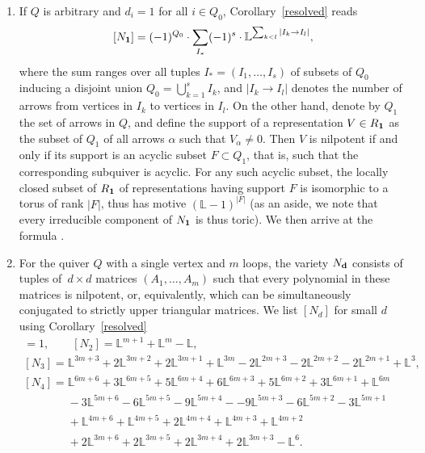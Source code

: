 \documentclass[pdftex]{sigma}
\numberwithin{equation}{section}
\theoremstyle{definition}
\begin{document}
\begin{enumerate}
\item[(3)] If $Q$ is arbitrary and $d_i=1$ for all $i\in Q_0$, Corollary~\ref{resolved} reads
\[[N_{\bf 1}]=(-1)^{Q_0}\cdot\sum_{I_*}(-1)^s\cdot\mathbb{L}^{\sum_{k<l}|I_k\rightarrow I_l|},\]
where the sum ranges over all tuples $I_*=(I_1,\dots,I_s)$ of subsets of $Q_0$ inducing a disjoint union $Q_0=\bigcup_{k=1}^sI_k$, and $|I_k\rightarrow I_l|$ denotes the number of arrows from vertices in $I_k$ to vertices in $I_l$. On the other hand, denote by $Q_1$ the set of arrows in $Q$, and define the support of a representation $V\in R_{\bf 1}$ as the subset of $Q_1$ of all arrows $\alpha$ such that $V_\alpha\not=0$. Then $V$ is nilpotent if and only if its support is an acyclic subset $F\subset Q_1$, that is, such that the corresponding subquiver is acyclic. For any such acyclic subset, the locally closed subset of $R_{\bf 1}$ of representations having support $F$ is isomorphic to a torus of rank $|F|$, thus has motive $(\mathbb{L}-1)^{|F|}$ (as an aside, we note that every irreducible component of $N_{\bf 1}$ is thus toric). We then arrive at the formula
.
\item[(4)] For the quiver $Q$ with a single vertex and $m$ loops, the variety $N_{\bf d}$ consists of tuples of~$d\times d$ matrices $(A_1,\dots,A_m)$ such that every polynomial in these matrices is nilpotent, or, equivalently, which can be simultaneously conjugated to strictly upper triangular matrices. We list $[N_d]$ for small $d$ using Corollary~\ref{resolved}
\begin{gather*}
[N_1]=1, \qquad [N_2]=\mathbb{L}^{m+1}+\mathbb{L}^m-\mathbb{L},\\
[N_3]=\mathbb{L}^{3m+3}+2\mathbb{L}^{3m+2}+2\mathbb{L}^{3m+1}+\mathbb{L}^{3m}
-2\mathbb{L}^{2m+3}-2\mathbb{L}^{2m+2}-2\mathbb{L}^{2m+1}+\mathbb{L}^3,\\
[N_4]=\mathbb{L}^{6m+6}+3\mathbb{L}^{6m+5}+5\mathbb{L}^{6m+4}+6\mathbb{L}^{6m+3}+5\mathbb{L}^{6m+2}+3\mathbb{L}^{6m+1}+\mathbb{L}^{6m}\\
\phantom{[N_4]=}{}-3\mathbb{L}^{5m+6}-6\mathbb{L}^{5m+5}-9\mathbb{L}^{5m+4}-
-9\mathbb{L}^{5m+3}-6\mathbb{L}^{5m+2}
-3\mathbb{L}^{5m+1}\\
\phantom{[N_4]=}{}+\mathbb{L}^{4m+6}+\mathbb{L}^{4m+5}+2\mathbb{L}^{4m+4}+\mathbb{L}^{4m+3}+\mathbb{L}^{4m+2}\\
\phantom{[N_4]=}{}+2\mathbb{L}^{3m+6}+2\mathbb{L}^{3m+5}+2\mathbb{L}^{3m+4}+2\mathbb{L}^{3m+3}-\mathbb{L}^6.
\end{gather*}

\end{enumerate}
\end{document}
